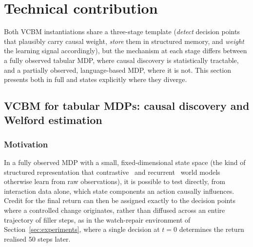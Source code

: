 \section{Technical contribution}
\label{sec:technical-contribution}

Both VCBM instantiations share a three-stage template (\emph{detect} decision points that plausibly carry causal weight, \emph{store} them in structured memory, and \emph{weight} the learning signal accordingly), but the mechanism at each stage differs between a fully observed tabular MDP, where causal discovery is statistically tractable, and a partially observed, language-based MDP, where it is not. This section presents both in full and states explicitly where they diverge.

\subsection{VCBM for tabular MDPs: causal discovery and Welford estimation}
\label{sec:vcbm-tabular}

\subsubsection{Motivation}
In a fully observed MDP with a small, fixed-dimensional state space (the kind of structured representation that contrastive~\cite{kipf2020cswm} and recurrent~\cite{ha2018worldmodels} world models otherwise learn from raw observations), it is possible to test directly, from interaction data alone, which state components an action causally influences. Credit for the final return can then be assigned exactly to the decision points where a controlled change originates, rather than diffused across an entire trajectory of filler steps, as in the watch-repair environment of Section~\ref{sec:experiments}, where a single decision at $t=0$ determines the return realised 50 steps later.

